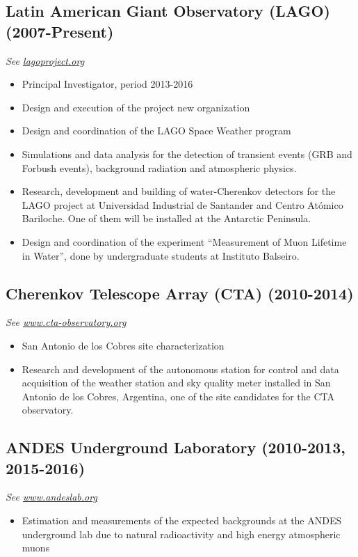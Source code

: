 \subsection*{Latin American Giant Observatory (LAGO) (2007-Present)}
{\small{\textit{See \href{http://lagoproject.org}{lagoproject.org}}}}
\begin{itemize}
\item Principal Investigator, period 2013-2016
\item Design and execution of the project new organization
\item Design and coordination of the LAGO Space Weather program 
\item Simulations and data analysis for the detection of transient events
(GRB and Forbush events), background radiation and atmospheric physics.
\item Research, development and building of water-Cherenkov detectors for the
	LAGO project at Universidad Industrial de Santander and Centro Atómico
	Bariloche. One of them will be
installed at the Antarctic Peninsula.
\item Design and coordination of the experiment ``Measurement of Muon Lifetime in Water'', done by undergraduate students at Instituto Balseiro.
\end{itemize}

\subsection*{Cherenkov Telescope Array (CTA) (2010-2014)}
{\small{\textit{See \href{http://www.cta-observatory.org}{www.cta-observatory.org}}}}
\begin{itemize}
\item San Antonio de los Cobres site characterization
\item Research and development of the autonomous station for control and data
acquisition of the weather station and sky quality meter installed in San
Antonio de los Cobres, Argentina, one of the site candidates for the CTA
observatory.
\end{itemize}

\subsection*{ANDES Underground Laboratory (2010-2013, 2015-2016)}
{\small{\textit{See \href{http://www.andeslab.org}{www.andeslab.org}}}}
\begin{itemize}
\item Estimation and measurements of the expected backgrounds at the ANDES
underground lab due to natural radioactivity and high energy atmospheric muons
\end{itemize}


